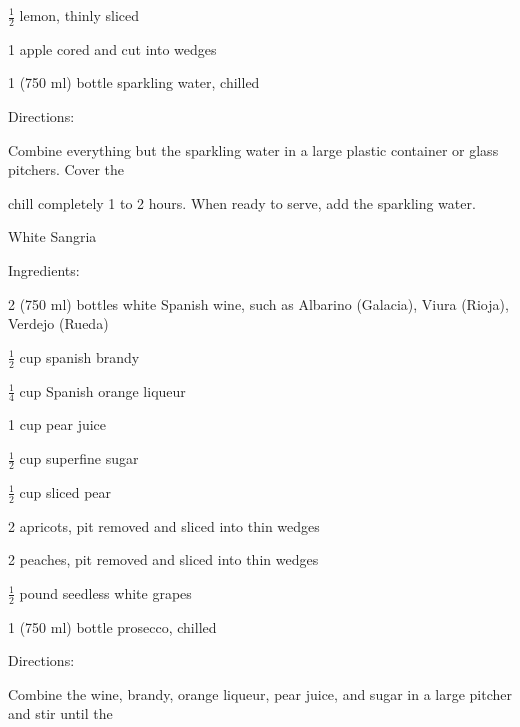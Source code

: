 \documentclass[a4paper,portrait,12pt]{book}
\begin{document}
$\frac{1}{2}$ lemon, thinly sliced




1 apple cored and cut into wedges




1 (750 ml) bottle sparkling water, chilled




Directions:




Combine everything but the sparkling water in a large plastic container or glass pitchers. Cover the




chill completely 1 to 2 hours. When ready to serve, add the sparkling water.







\newpage
White Sangria




Ingredients:




2 (750 ml) bottles white Spanish wine, such as Albarino (Galacia), Viura (Rioja), Verdejo (Rueda)




$\frac{1}{2}$ cup spanish brandy




$\frac{1}{4}$ cup Spanish orange liqueur




1 cup pear juice




$\frac{1}{2}$ cup superfine sugar




$\frac{1}{2}$ cup sliced pear




2 apricots, pit removed and sliced into thin wedges




2 peaches, pit removed and sliced into thin wedges




$\frac{1}{2}$ pound seedless white grapes




1 (750 ml) bottle prosecco, chilled




Directions:




Combine the wine, brandy, orange liqueur, pear juice, and sugar in a large pitcher and stir until the
\end{document}
